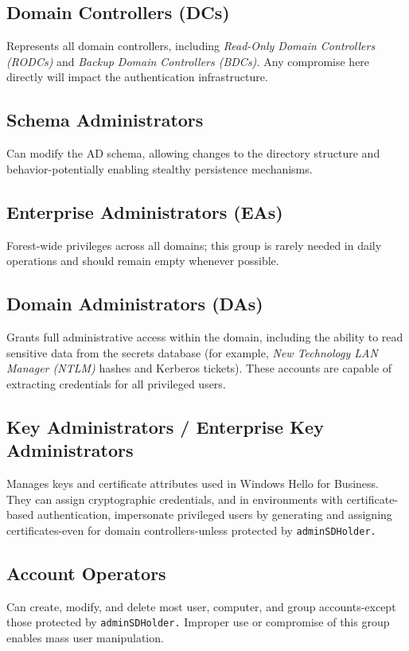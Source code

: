 \subsection{Domain Controllers (DCs)}
Represents all domain controllers, including
\textit{Read-Only Domain Controllers (RODCs)}
and
\textit{Backup Domain Controllers (BDCs).}
Any compromise here directly will impact the authentication infrastructure.

\subsection{Schema Administrators}
Can modify the AD schema, allowing changes to the directory structure and behavior-potentially enabling stealthy persistence mechanisms.

\subsection{Enterprise Administrators (EAs)}
Forest-wide privileges across all domains; this group is rarely needed in daily operations and should remain empty whenever possible.

\subsection{\textbf{Domain Administrators (DAs)}}
Grants full administrative access within the domain, including the ability to read sensitive data from the secrets database (for example, \textit{New Technology LAN Manager (NTLM)} hashes and Kerberos tickets). These accounts are capable of extracting credentials for all privileged users.

\subsection{Key Administrators / Enterprise Key Administrators}
Manages keys and certificate attributes used in Windows Hello for Business. They can assign cryptographic credentials, and in environments with certificate-based authentication, impersonate privileged users by generating and assigning certificates-even for domain controllers-unless protected by \texttt{adminSDHolder.}

\subsection{Account Operators}
Can create, modify, and delete most user, computer, and group accounts-except those protected by \texttt{adminSDHolder.} Improper use or compromise of this group enables mass user manipulation.


